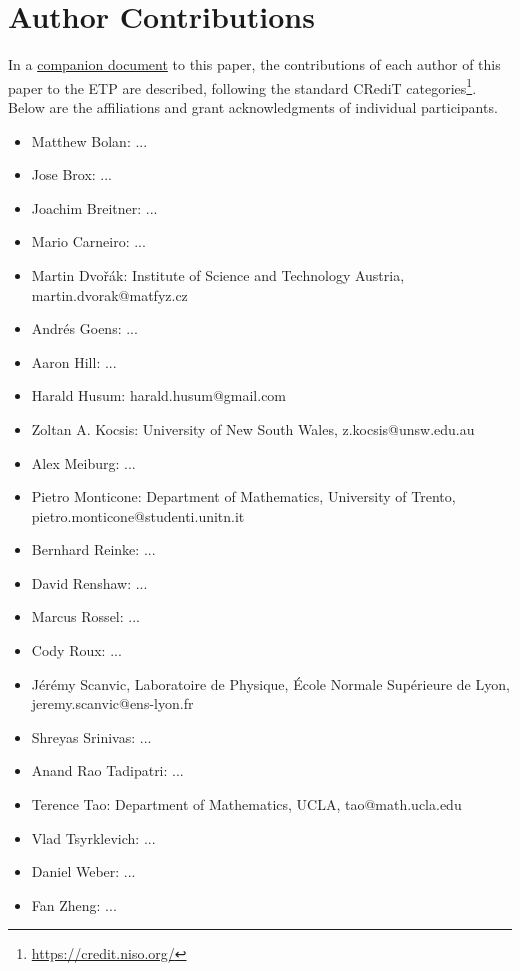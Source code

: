 \section{Author Contributions}

In a \href{https://github.com/teorth/equational_theories/blob/main/paper/contributions.md}{companion document} to this paper, the contributions of each author of this paper to the ETP are described, following the standard CRediT categories\footnote{\url{https://credit.niso.org/}}.  Below are the affiliations and grant acknowledgments of individual participants.


\begin{itemize}
    \item Matthew Bolan: ...
    \item Jose Brox: ...
    \item Joachim Breitner: ...
    \item Mario Carneiro: ...
    \item Martin Dvo\v{r}\'ak: Institute of Science and Technology Austria, martin.dvorak@matfyz.cz
    \item Andr\'es Goens: ...
    \item Aaron Hill: ...
    \item Harald Husum: harald.husum@gmail.com
    \item Zoltan A. Kocsis: University of New South Wales, z.kocsis@unsw.edu.au
    \item Alex Meiburg: ...
    \item Pietro Monticone: Department of Mathematics, University of Trento, pietro.monticone@studenti.unitn.it
    \item Bernhard Reinke: ...
    \item David Renshaw: ...
    \item Marcus Rossel: ...
    \item Cody Roux: ...
    \item J\'er\'emy Scanvic, Laboratoire de Physique, École Normale Supérieure de Lyon, jeremy.scanvic@ens-lyon.fr
    \item Shreyas Srinivas: ...
    \item Anand Rao Tadipatri: ...
    \item Terence Tao: Department of Mathematics, UCLA, tao@math.ucla.edu
    \item Vlad Tsyrklevich: ...
    \item Daniel Weber: ...
    \item Fan Zheng: ...
\end{itemize}
